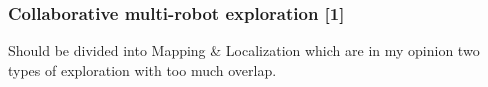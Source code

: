 
\subsubsection{Collaborative multi-robot exploration [1]}
\cite{burgard2005coordinated}
Should be divided into Mapping \& Localization which are in my opinion two types of exploration with too much overlap.
